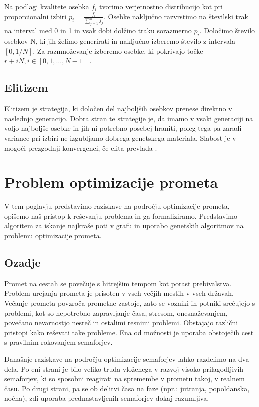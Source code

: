 \documentclass[a4paper, 12pt]{book}
\begin{document}
Na podlagi kvalitete osebka $f_i$ tvorimo verjetnostno distribucijo kot pri proporcionalni izbiri
$p_i = \frac{f_i}{\sum_{j=1}^n f_j}$. Osebke naklju\v cno razvrstimo na \v stevilski trak na interval med 0 in 1 in vsak dobi dol\v zino traku sorazmerno $p_i$. Dolo\v cimo \v stevilo osebkov N, ki jih \v zelimo generirati in naklju\v cno izberemo \v stevilo z intervala $[0, 1/N]$. Za razmno\v zevanje izberemo osebke, ki pokrivajo to\v cke $r + iN, i \in [0, 1, \dots, N -1]$ \cite{inteligentni sistemi}.

\section{Elitizem}
Elitizem je strategija, ki dolo\v cen del najbolj\v sih osebkov prenese direktno v naslednjo generacijo. Dobra stran te strategije je, da imamo v vsaki generaciji na voljo najbolj\v se osebke in jih ni potrebno posebej hraniti, poleg tega pa zaradi variance pri izbiri ne izgubljamo dobrega genetskega materiala. Slabost je v mogo\v ci prezgodnji konvergenci, \v ce elita prevlada
\cite{inteligentni sistemi}.

\chapter{Problem optimizacije prometa}
\label{ch2}
V tem poglavju predstavimo raziskave na podro\v cju optimizacije prometa, opi\v semo na\v s pristop k re\v sevanju problema in ga formaliziramo. Predstavimo algoritem za iskanje najkra\v se poti v grafu in uporabo genetskih algoritmov na problemu optimizacije prometa.

\section{Ozadje}
Promet na cestah se pove\v cuje s hitrej\v sim tempom kot porast prebivalstva. Problem urejanja prometa je prisoten v vseh ve\v cjih mestih v vseh dr\v zavah. Ve\v canje prometa povzro\v ca prometne zastoje, zato se vozniki in potniki sre\v cujejo s problemi, kot so nepotrebno zapravljanje \v casa, stresom, onesna\v zevanjem, pove\v cano nevarnostjo nesre\v c in ostalimi resnimi problemi. Obstajajo razli\v cni pristopi kako re\v sevati take probleme. Ena od mo\v znosti je uporaba obstoje\v cih cest s pravilnim rokovanjem semaforjev. 

Dana\v snje raziskave na podro\v cju optimizacije semaforjev lahko razdelimo na dva dela. Po eni strani je bilo veliko truda vlo\v zenega v razvoj visoko prilagodljivih semaforjev, ki so sposobni reagirati na spremembe v prometu takoj, v realnem \v casu. Po drugi strani, pa se ob delitvi \v casa na  faze (npr.: jutranja, popoldanska, no\v cna), zdi uporaba prednastavljenih semaforjev dokaj razumljiva.
\end{document}
